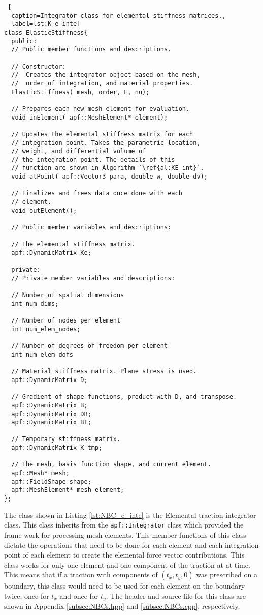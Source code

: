 \documentclass[a4paper, 12pt]{article}
\begin{document}
\begin{lstlisting} [
  caption=Integrator class for elemental stiffness matrices.,
  label=lst:K_e_inte]
class ElasticStiffness{
  public:
  // Public member functions and descriptions.

  // Constructor:
  //  Creates the integrator object based on the mesh,
  //  order of integration, and material properties.
  ElasticStiffness( mesh, order, E, nu);

  // Prepares each new mesh element for evaluation.
  void inElement( apf::MeshElement* element);

  // Updates the elemental stiffness matrix for each 
  // integration point. Takes the parametric location,
  // weight, and differential volume of 
  // the integration point. The details of this 
  // function are shown in Algorithm `\ref{al:KE_int}`.
  void atPoint( apf::Vector3 para, double w, double dv);

  // Finalizes and frees data once done with each 
  // element.
  void outElement();

  // Public member variables and descriptions:

  // The elemental stiffness matrix.  
  apf::DynamicMatrix Ke;

  private:
  // Private member variables and descriptions:

  // Number of spatial dimensions
  int num_dims;
  
  // Number of nodes per element
  int num_elem_nodes;

  // Number of degrees of freedom per element
  int num_elem_dofs

  // Material stiffness matrix. Plane stress is used.
  apf::DynamicMatrix D;

  // Gradient of shape functions, product with D, and transpose.
  apf::DynamicMatrix B;
  apf::DynamicMatrix DB;
  apf::DynamicMatrix BT;

  // Temporary stiffness matrix.
  apf::DynamicMatrix K_tmp;

  // The mesh, basis function shape, and current element.
  apf::Mesh* mesh;
  apf::FieldShape shape;
  apf::MeshElement* mesh_element;
};
\end{lstlisting}
\vspace{\baselineskip}

The class shown in Listing 
\ref{lst:NBC_e_inte} is the 
Elemental traction integrator
class.
This class inherits from the \texttt{apf::Integrator} class
which provided the frame work for processing mesh elements.
This member functions of this class dictate the operations that 
need to be done for each element and each integration point 
of each element to create the elemental force vector contributions.
This class works for only one element and one component of 
the traction at at time. This means that if a traction with
components of $(t_x, t_y, 0)$ was prescribed on a boundary, 
this class would need to be used for each element on the boundary
twice; once for $t_x$ and once for $t_y$.
The header and source file for this class are shown in Appendix 
\ref{subsec:NBCs.hpp} and 
\ref{subsec:NBCs.cpp}, 
respectively.
\end{document}
